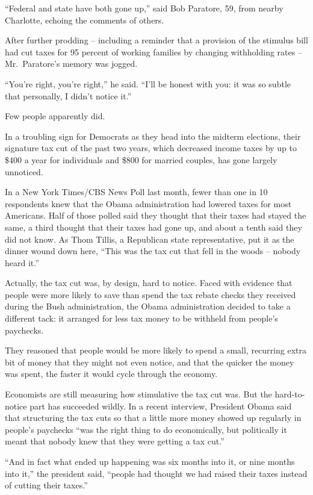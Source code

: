 ﻿\documentclass[12pt]{article}
\begin{document}
``Federal and state have both gone up,'' said Bob Paratore, 59, from nearby Charlotte, echoing the
comments of others.

After further prodding -- including a reminder that a provision of the stimulus bill had cut taxes
for 95 percent of working families by changing withholding rates -- Mr.~Paratore's memory was
jogged.

``You're right, you're right,'' he said. ``I'll be honest with you: it was so subtle that
personally, I didn't notice it.''

Few people apparently did.

In a troubling sign for Democrats as they head into the midterm elections, their signature tax cut
of the past two years, which decreased income taxes by up to \$400 a year for individuals and \$800
for married couples, has gone largely unnoticed.

In a New York Times/CBS News Poll last month, fewer than one in 10 respondents knew that the Obama
administration had lowered taxes for most Americans. Half of those polled said they thought that
their taxes had stayed the same, a third thought that their taxes had gone up, and about a tenth
said they did not know. As Thom Tillis, a Republican state representative, put it as the dinner
wound down here, ``This was the tax cut that fell in the woods -- nobody heard it.''

Actually, the tax cut was, by design, hard to notice. Faced with evidence that people were more
likely to save than spend the tax rebate checks they received during the Bush administration, the
Obama administration decided to take a different tack: it arranged for less tax money to be withheld
from people's paychecks.

They reasoned that people would be more likely to spend a small, recurring extra bit of money that
they might not even notice, and that the quicker the money was spent, the faster it would cycle
through the economy.

Economists are still measuring how stimulative the tax cut was. But the hard-to-notice part has
succeeded wildly. In a recent interview, President Obama said that structuring the tax cuts so that
a little more money showed up regularly in people's paychecks ``was the right thing to do
economically, but politically it meant that nobody knew that they were getting a tax cut.''

``And in fact what ended up happening was six months into it, or nine months into it,'' the
president said, ``people had thought we had raised their taxes instead of cutting their taxes.''
\end{document}

